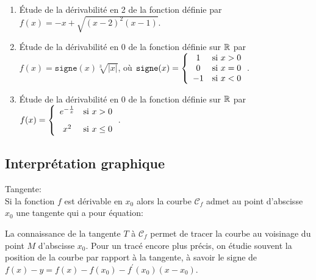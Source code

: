 \documentclass[a4paper, 11pt]{article}
\begin{document}
\begin{exercice}
	\begin{enumerate}
		\item \'Etude de la d\'erivabilit\'e en 2 de la fonction d\'efinie par $f(x)=-x+\sqrt{(x-2)^2(x-1)}$.
		\item \'Etude de la d\'erivabilit\'e en 0 de la fonction d\'efinie sur $\mathbb{R}$ par $f(x)= \texttt{signe}(x)\sqrt[3]{|x|}$, o\`u $\texttt{signe}(x) = \left\lbrace\begin{array}{cl}
				      1  & \hbox{si}\ x>0  \\
				      0  & \hbox{si}\ x=0  \\
				      -1 & \hbox{si}\ x< 0\end{array}\right.$.
		      \vspace*{-0.2cm}
		\item \'Etude de la d\'erivabilit\'e en 0 de la fonction d\'efinie sur $\mathbb{R}$ par $f(x)=\left\lbrace\begin{array}{cl} e^{-\frac{1}{x}} & \hbox{si}\ x>0\vsec \\
             x^2                   & \hbox{si}\ x\leq 0\end{array}\right.$.
	\end{enumerate}
\end{exercice}

\subsection{Interpr\'etation graphique}



\begin{prop} Tangente:\\
	\noindent Si la fonction $f$ est d\'erivable en $x_0$ alors la courbe $\mathcal{C}_f$ admet au point d'abscisse $x_0$ une tangente qui a pour \'equation: \dotfill  \vsec
\end{prop}



\begin{rem}
	La connaissance de la tangente $T$ \`a $\mathcal{C}_f$ permet de tracer la courbe au voisinage du point $M$ d'abscisse $x_0$. Pour un trac\'e encore plus pr\'ecis, on \'etudie souvent la position de la courbe par rapport \`a la tangente, \`a savoir le signe de $f(x)-y=f(x)-f(x_0)-f^{\prime}(x_0)(x-x_0)$.
\end{rem}
\end{document}

